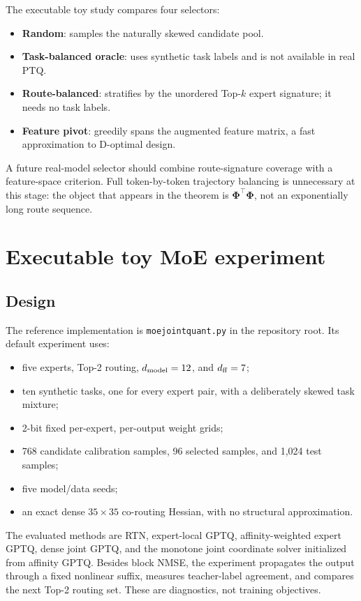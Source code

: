 \documentclass[11pt]{article}
\theoremstyle{plain}
\theoremstyle{definition}
\theoremstyle{remark}
\newcommand{\PhiM}{\bm\Phi}
\begin{document}
The executable toy study compares four selectors:
\begin{itemize}
  \item \textbf{Random}: samples the naturally skewed candidate pool.
  \item \textbf{Task-balanced oracle}: uses synthetic task labels and is not available in real PTQ.
  \item \textbf{Route-balanced}: stratifies by the unordered Top-$k$ expert signature; it needs no task labels.
  \item \textbf{Feature pivot}: greedily spans the augmented feature matrix, a fast approximation to D-optimal design.
\end{itemize}

A future real-model selector should combine route-signature coverage with a feature-space criterion.  Full token-by-token trajectory balancing is unnecessary at this stage: the object that appears in the theorem is $\PhiM^\top\PhiM$, not an exponentially long route sequence.

\section{Executable toy MoE experiment}

\subsection{Design}

The reference implementation is \texttt{moejointquant.py} in the repository root.  Its default experiment uses:
\begin{itemize}
  \item five experts, Top-2 routing, $d_{\rm model}=12$, and $d_{\rm ff}=7$;
  \item ten synthetic tasks, one for every expert pair, with a deliberately skewed task mixture;
  \item 2-bit fixed per-expert, per-output weight grids;
  \item 768 candidate calibration samples, 96 selected samples, and 1,024 test samples;
  \item five model/data seeds;
  \item an exact dense $35\times35$ co-routing Hessian, with no structural approximation.
\end{itemize}

The evaluated methods are RTN, expert-local GPTQ, affinity-weighted expert GPTQ, dense joint GPTQ, and the monotone joint coordinate solver initialized from affinity GPTQ.  Besides block NMSE, the experiment propagates the output through a fixed nonlinear suffix, measures teacher-label agreement, and compares the next Top-2 routing set.  These are diagnostics, not training objectives.
\end{document}
